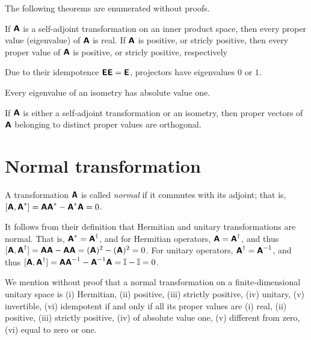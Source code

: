 The following theorems are enumerated without proofs.

If $\textsf{\textbf{A}}$
is a self-adjoint transformation on an inner product space, then every proper value (eigenvalue)  of $\textsf{\textbf{A}}$
is real.
If $\textsf{\textbf{A}}$ is positive, or stricly positive,
then every proper value of  $\textsf{\textbf{A}}$ is positive, or stricly positive, respectively

Due to their idempotence $\textsf{\textbf{E}}\textsf{\textbf{E}}=\textsf{\textbf{E}}$,
projectors have eigenvalues $0$ or $1$.

Every eigenvalue of an isometry has absolute value one.

If  $\textsf{\textbf{A}}$  is either a self-adjoint transformation or an isometry,
then proper vectors of $ \textsf{\textbf{A}}$
belonging to distinct proper values are orthogonal.


\section{Normal transformation}

A transformation $\textsf{\textbf{A}}$ is called {\em normal}
if it commutes with its adjoint; that is,
$[\textsf{\textbf{A}},\textsf{\textbf{A}}^*]= \textsf{\textbf{A}}\textsf{\textbf{A}}^* -
\textsf{\textbf{A}}^* \textsf{\textbf{A}} =0$.

It follows from their definition that Hermitian and unitary transformations are normal. That is,
$\textsf{\textbf{A}}^\ast =\textsf{\textbf{A}}^\dagger$,
and for Hermitian operators,
$\textsf{\textbf{A}}=\textsf{\textbf{A}}^\dagger$,
and thus
$[\textsf{\textbf{A}},\textsf{\textbf{A}}^\dagger]= \textsf{\textbf{A}}\textsf{\textbf{A}} -
\textsf{\textbf{A}} \textsf{\textbf{A}} =(\textsf{\textbf{A}})^2 -(\textsf{\textbf{A}})^2=0$.
For unitary operators,
$\textsf{\textbf{A}}^\dagger =\textsf{\textbf{A}}^{-1}$,
and thus
$[\textsf{\textbf{A}},\textsf{\textbf{A}}^\dagger]= \textsf{\textbf{A}}\textsf{\textbf{A}}^{-1} -
\textsf{\textbf{A}}^{-1} \textsf{\textbf{A}} ={\Bbb I} -{\Bbb I} =0$.


We mention without proof that
a normal transformation on a finite-dimensional unitary space is
(i) Hermitian,
(ii) positive,
(iii) strictly positive,
(iv) unitary,
(v) invertible,
(vi) idempotent
if and only if all its proper values are
(i) real,
(ii) positive,
(iii) strictly positive,
(iv) of absolute value one,
(v) different from zero,
(vi) equal to zero or one.

